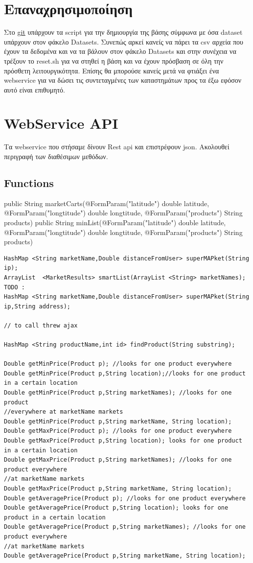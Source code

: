 \documentclass[a4paper,10pt]{report}
\begin{document}
\section{Επαναχρησιμοποίηση}
Στο \href{https://github.com/Pana-sonic/aginara/tree/master/Database}{git} υπάρχουν τα script 
για την δημιουργία της βάσης σύμφωνα με όσα dataset υπάρχουν στον φάκελο Datasets. Συνεπώς αρκεί
κανείς να πάρει τα csv αρχεία που έχουν τα δεδομένα και να τα βάλουν στον φάκελο Datasets και στην
συνέχεια να τρέξουν το reset.sh για να στηθεί η βάση και να έχουν πρόσβαση σε όλη την πρόσθετη
λειτουργικότητα. Επίσης θα μπορούσε κανείς μετά να φτιάξει ένα webservice για να δώσει τις 
συντεταγμένες των καταστημάτων προς τα έξω εφόσον αυτό είναι επιθυμητό.

\section{WebService API}

Τα webservice που στήσαμε δίνουν Rest api και επιστρέφουν json. Ακολουθεί περιγραφή των 
διαθέσιμων μεθόδων.
\subsection{Functions}

public String marketCarts(@FormParam("latitude") double latitude, @FormParam("longtitude") double longtitude, @FormParam("products") String products)
public String minList(@FormParam("latitude") double latitude, @FormParam("longtitude") double longtitude, @FormParam("products") String products)

\begin{verbatim}
HashMap <String marketName,Double distanceFromUser> superMAPket(String ip); 
ArrayList  <MarketResults> smartList(ArrayList <String> marketNames); 
TODO : 
HashMap <String marketName,Double distanceFromUser> superMAPket(String ip,String address); 

// to call threw ajax

HashMap <String productName,int id> findProduct(String substring);

Double getMinPrice(Product p); //looks for one product everywhere
Double getMinPrice(Product p,String location);//looks for one product in a certain location
Double getMinPrice(Product p,String marketNames); //looks for one product 
//everywhere at marketName markets
Double getMinPrice(Product p,String marketName, String location);
Double getMaxPrice(Product p); //looks for one product everywhere
Double getMaxPrice(Product p,String location); looks for one product in a certain location
Double getMaxPrice(Product p,String marketNames); //looks for one product everywhere 
//at marketName markets
Double getMaxPrice(Product p,String marketName, String location);
Double getAveragePrice(Product p); //looks for one product everywhere
Double getAveragePrice(Product p,String location); looks for one product in a certain location
Double getAveragePrice(Product p,String marketNames); //looks for one product everywhere 
//at marketName markets
Double getAveragePrice(Product p,String marketName, String location);

\end{verbatim}
\end{document}
